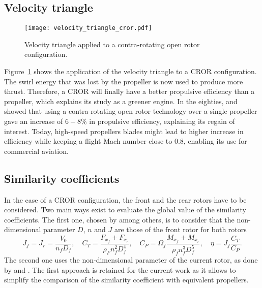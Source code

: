 \subsection{Velocity triangle}
\label{sub:cror_velocity_triangle}
\begin{figure}[htp]
  \centering
  \texttt{[image: velocity\_triangle\_cror.pdf]}
  \caption{Velocity triangle applied to a contra-rotating open rotor configuration.}
  \label{fig:velocity_triangle_cror}
\end{figure}
Figure~\ref{fig:velocity_triangle_cror} shows the application
of the velocity triangle to a CROR configuration. The swirl
energy that was lost by the propeller is now used to 
produce more thrust. Therefore, a CROR will finally have a better propulsive
efficiency than a propeller, which explains its study as
a greener engine. In the eighties, 
\citet{Strack1981} and \citet{Hager1988} showed that
using a contra-rotating open rotor technology over
a single propeller gave an increase of $6-8\%$
in propulsive efficiency, explaining its regain of interest.
Today, high-speed propellers blades might lead to higher increase
in efficiency
while keeping a flight Mach number close to $0.8$, enabling its use
for commercial aviation.

\subsection{Similarity coefficients}
\label{sub:cror_similarity_coeff}

In the case of a CROR configuration, the front and the rear rotors 
have to be considered.
Two main ways exist to evaluate the global value of the
similarity coefficients. The first one, chosen by
\citet{Bechet2011} among others, is to consider
that the non-dimensional parameter $D$, $n$ and $J$ are those
of the front rotor for both rotors
\begin{equation}
    J_f = J_r = \frac{V_0}{n_f D_f}, \quad
    C_T = \frac{F_{x_f} + F_{x_r}}{\rho_F n_f ^ 2  D_f ^ 4}, \quad
    C_P = \Omega_f \frac{M_{x_f} + M_{x_r}}{\rho_f n_f ^ 3 D_f ^ 5}, \quad
    \eta = J_f \frac{C_T}{C_P}.
\end{equation} 
The second one uses the non-dimensional parameter of the current rotor,
as done by \citet{Stuermer2008} and \citet{Zachariadis2011}.
The first approach is retained for the current work as it allows
to simplify the comparison of the similarity coefficient with equivalent propellers.
